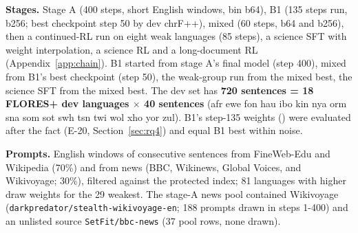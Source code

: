 \textbf{Stages.} Stage A (400 steps, short English windows, bin b64), B1 (135 steps run, b256; best checkpoint step 50 by dev chrF++), mixed (60 steps, b64 and b256), then a continued-RL run on eight weak languages (85 steps), a science SFT with weight interpolation, a science RL and a long-document RL (Appendix~\ref{app:chain}). B1 started from stage A's final model (step 400), mixed from B1's best checkpoint (step 50), the weak-group run from the mixed best, the science SFT from the mixed best. The dev set has \textbf{720 sentences = 18 FLORES+ dev languages $\times$ 40 sentences} (afr ewe fon hau ibo kin nya orm sna som sot swh tsn twi wol xho yor zul). B1's step-135 weights () were evaluated after the fact (E-20, Section~\ref{sec:rq4}) and equal B1 best within noise. 

\textbf{Prompts.} English windows of consecutive sentences from FineWeb-Edu and Wikipedia (70\%) and from news (BBC, Wikinews, Global Voices, and Wikivoyage; 30\%), filtered against the protected index; 81 languages with higher draw weights for the 29 weakest. The stage-A news pool contained Wikivoyage (\texttt{darkpredator/\allowbreak{}stealth-\allowbreak{}wikivoyage-\allowbreak{}en}; 188 prompts drawn in steps 1-400) and an unlisted source \texttt{SetFit/\allowbreak{}bbc-\allowbreak{}news} (37 pool rows, none drawn). 

